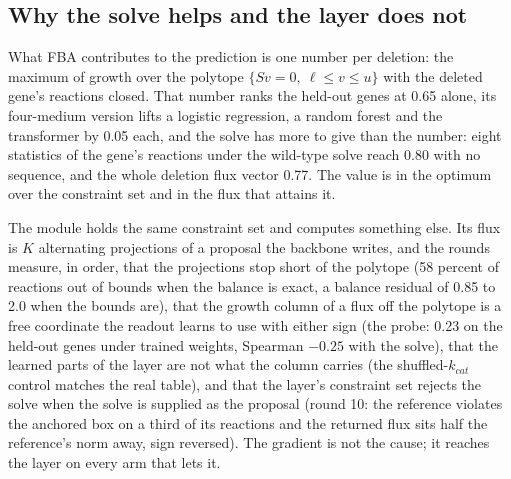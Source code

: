 \subsection{Why the solve helps and the layer does not}

What FBA contributes to the prediction is one number per deletion: the maximum of growth
over the polytope $\{Sv = 0,\ \ell \le v \le u\}$ with the deleted gene's reactions
closed. That number ranks the held-out genes at 0.65 alone, its four-medium version
lifts a logistic regression, a random forest and the transformer by 0.05 each, and the
solve has more to give than the number: eight statistics of the gene's reactions under
the wild-type solve reach 0.80 with no sequence, and the whole deletion flux vector
0.77. The value is in the optimum over the constraint set and in the flux that attains
it.

The module holds the same constraint set and computes something else. Its flux is $K$
alternating projections of a proposal the backbone writes, and the rounds measure, in
order, that the projections stop short of the polytope (58 percent of reactions out of
bounds when the balance is exact, a balance residual of 0.85 to 2.0 when the bounds
are), that the growth column of a flux off the polytope is a free coordinate the readout
learns to use with either sign (the probe: 0.23 on the held-out genes under trained
weights, Spearman $-0.25$ with the solve), that the learned parts of the layer are not
what the column carries (the shuffled-$k_{cat}$ control matches the real table), and
that the layer's constraint set rejects the solve when the solve is supplied as the
proposal (round 10: the reference violates the anchored box on a third of its reactions
and the returned flux sits half the reference's norm away, sign reversed). The gradient
is not the cause; it reaches the layer on every arm that lets it.

